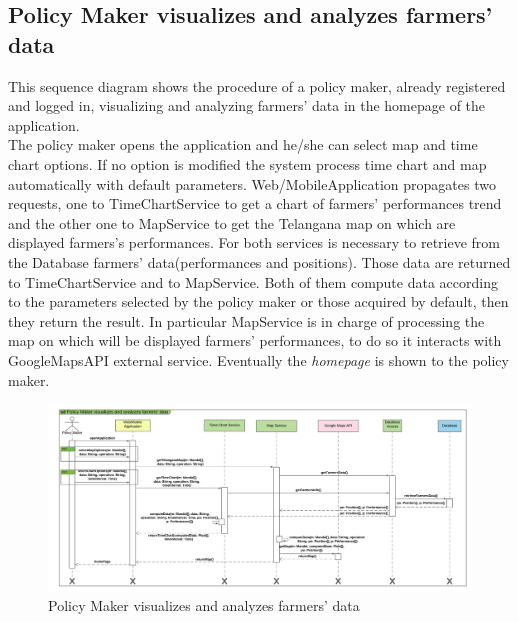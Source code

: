 \subsection{Policy Maker visualizes and analyzes farmers' data}

This sequence diagram shows the procedure of a policy maker, already registered and logged in, visualizing and analyzing farmers' data in the homepage of the application.\\
The policy maker opens the application and he/she can select map and time chart options. If no option is modified the system process time chart and map automatically with default parameters.  
Web/MobileApplication propagates two requests, one to TimeChartService to get a chart of farmers' performances trend and the other one to MapService to get the Telangana map on which are displayed farmers's performances. For both services is necessary to retrieve from the Database farmers' data(performances and positions). Those data are returned to TimeChartService and to MapService. Both of them compute data according to the parameters selected by the policy maker or those acquired by default, then they return the result. In particular MapService is in charge of processing the map on which will be displayed farmers' performances, to do so it interacts with GoogleMapsAPI external service.
Eventually the \textit{homepage} is shown to the policy maker.

\newpage
\begin{landscape}
\begin{figure}[t!]
\vspace*{1cm}
\noindent
\centering
\centerline{\includegraphics[scale= 0.108]{./Images/Sequence diagram/Policy Maker visualizes and analyzes farmers' data.png}}
    \caption{Policy Maker visualizes and analyzes farmers' data}
    \vspace*{-12cm}
\end{figure}
\fillandplacepagenumber
\end{landscape}

















